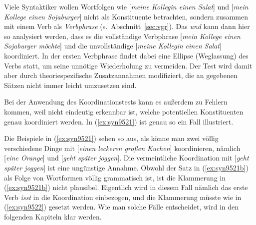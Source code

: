 Viele Syntaktiker wollen Wortfolgen wie [\textit{meine Kollegin einen Salat}] und [\textit{mein Kollege einen Sojaburger}] nicht als Konstituente betrachten, sondern zusammen mit einem Verb als \textit{Verbphrase} (s.\ Abschnitt~\ref{sec:vgr}).
Das \textit{und} kann dann hier so analysiert werden, dass es die vollständige Verbphrase [\textit{mein Kollege einen Sojaburger möchte}] und die unvollständige [\textit{meine Kollegin einen Salat}] koordiniert.
In der ersten Verbphrase findet dabei eine Ellipse (Weglassung) des Verbs statt, um seine unnötige Wiederholung zu vermeiden.
Der Test wird damit aber durch theoriespezifische Zusatzannahmen modifiziert, die an gegebenen Sätzen nicht immer leicht umzusetzen sind.

Bei der Anwendung des Koordinationstests kann es außerdem zu Fehlern kommen, weil nicht eindeutig erkennbar ist, welche potentiellen Konstituenten genau koordiniert werden.
In (\ref{ex:syn9521}) ist genau so ein Fall illustriert.

\begin{exe}
  \begin{xlist}
  \end{xlist}
\end{exe}

Die Beispiele in (\ref{ex:syn9521}) sehen so aus, als könne man zwei völlig verschiedene Dinge mit [\textit{einen leckeren großen Kuchen}] koordinieren, nämlich [\textit{eine Orange}] und [\textit{geht später joggen}].
Die vermeintliche Koordination mit [\textit{geht später joggen}] ist eine ungünstige Annahme.
Obwohl der Satz in (\ref{ex:syn9521b}) als Folge von Wortformen völlig grammatisch ist, ist die Klammerung in (\ref{ex:syn9521b}) nicht plausibel.
Eigentlich wird in diesem Fall nämlich das erste Verb \textit{isst} in die Koordination einbezogen, und die Klammerung müsste wie in (\ref{ex:syn9522}) gesetzt werden.
Wie man solche Fälle entscheidet, wird in den folgenden Kapiteln klar werden.

\begin{exe}
\end{exe}

